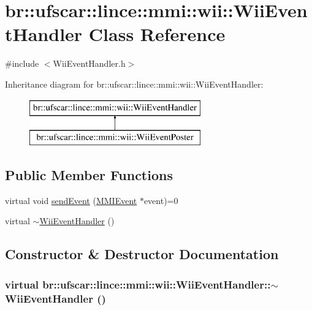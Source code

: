 \hypertarget{classbr_1_1ufscar_1_1lince_1_1mmi_1_1wii_1_1WiiEventHandler}{
\section{br::ufscar::lince::mmi::wii::WiiEventHandler Class Reference}
\label{classbr_1_1ufscar_1_1lince_1_1mmi_1_1wii_1_1WiiEventHandler}
}


{\ttfamily \#include $<$WiiEventHandler.h$>$}

Inheritance diagram for br::ufscar::lince::mmi::wii::WiiEventHandler:\begin{figure}[H]
\begin{center}
\leavevmode
\includegraphics[height=2cm]{classbr_1_1ufscar_1_1lince_1_1mmi_1_1wii_1_1WiiEventHandler}
\end{center}
\end{figure}
\subsection*{Public Member Functions}
\begin{DoxyCompactItemize}
\item 
virtual void \hyperlink{classbr_1_1ufscar_1_1lince_1_1mmi_1_1wii_1_1WiiEventHandler_a7e94bf7dc7fa2dd0552ff2c97faf9f41}{sendEvent} (\hyperlink{classbr_1_1ufscar_1_1lince_1_1mmi_1_1MMIEvent}{MMIEvent} $\ast$event)=0
\item 
virtual \hyperlink{classbr_1_1ufscar_1_1lince_1_1mmi_1_1wii_1_1WiiEventHandler_ab2407ecc0060c55e9b89241c3abc4eb4}{$\sim$WiiEventHandler} ()
\end{DoxyCompactItemize}


\subsection{Constructor \& Destructor Documentation}
\hypertarget{classbr_1_1ufscar_1_1lince_1_1mmi_1_1wii_1_1WiiEventHandler_ab2407ecc0060c55e9b89241c3abc4eb4}{
\subsubsection[{$\sim$WiiEventHandler}]{\setlength{\rightskip}{0pt plus 5cm}virtual br::ufscar::lince::mmi::wii::WiiEventHandler::$\sim$WiiEventHandler ()}}
\label{classbr_1_1ufscar_1_1lince_1_1mmi_1_1wii_1_1WiiEventHandler_ab2407ecc0060c55e9b89241c3abc4eb4}


